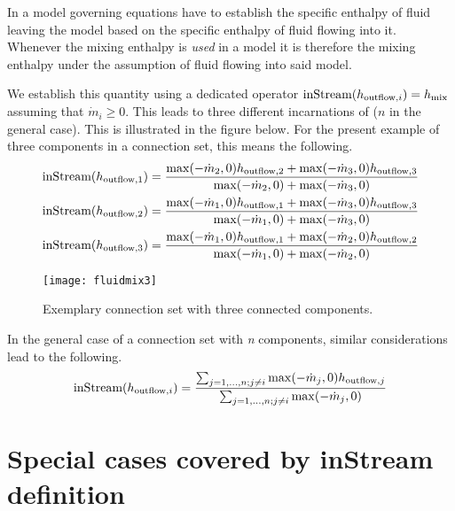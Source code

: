 In a model governing equations have to establish the specific enthalpy
of fluid leaving the model based on the specific enthalpy of fluid
flowing into it. Whenever the mixing enthalpy is \emph{used} in a model
it is therefore the mixing enthalpy under the assumption of fluid
flowing into said model.

We establish this quantity using a dedicated operator $\text{\lstinline!inStream!}(h_{\mathrm{outflow},i})=h_{\mathrm{mix}}$ assuming that $\dot{m}_{i} \geq 0$. This leads to
three different incarnations of ($n$ in the general case). This is
illustrated in the figure below. For the present example of three
components in a connection set, this means the following.
\begin{align*}
\text{\lstinline!inStream!}(h_{\mathrm{outflow},1}) &= \frac{\operatorname{max}(-\dot{m}_2,0)h_{\mathrm{outflow},2}+\operatorname{max}(-\dot{m}_3,0)h_{\mathrm{outflow},3}}{\operatorname{max}(-\dot{m}_2,0)+\operatorname{max}(-\dot{m}_3,0)}\\
\text{\lstinline!inStream!}(h_{\mathrm{outflow},2}) &= \frac{\operatorname{max}(-\dot{m}_1,0)h_{\mathrm{outflow},1}+\operatorname{max}(-\dot{m}_3,0)h_{\mathrm{outflow},3}}{\operatorname{max}(-\dot{m}_1,0)+\operatorname{max}(-\dot{m}_3,0)}\\
\text{\lstinline!inStream!}(h_{\mathrm{outflow},3}) &= \frac{\operatorname{max}(-\dot{m}_1,0)h_{\mathrm{outflow},1}+\operatorname{max}(-\dot{m}_2,0)h_{\mathrm{outflow},2}}{\operatorname{max}(-\dot{m}_1,0)+\operatorname{max}(-\dot{m}_2,0)}
\end{align*}
\begin{figure}[H]
  \begin{center}
    \texttt{[image: fluidmix3]}
  \end{center}
  \caption{Exemplary connection set with three connected components.}
\end{figure}

In the general case of a connection set with \emph{n} components,
similar considerations lead to the following.
\begin{equation*}
\text{\lstinline!inStream!}(h_{\mathrm{outflow},i})=\frac{\sum_{j=1,...,n;j\neq i}\operatorname{max}(-\dot{m}_j,0)h_{\mathrm{outflow},j}}{\sum_{j=1,...,n;j\neq i}\operatorname{max}(-\dot{m}_j,0)}
\end{equation*}

\section{Special cases covered by inStream definition}\label{special-cases-covered-by-the-instream-operator-definition}
